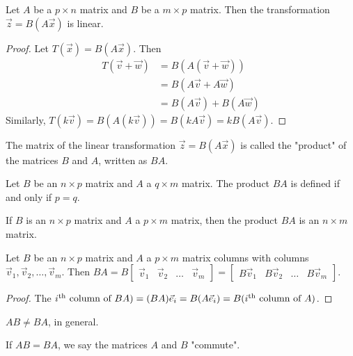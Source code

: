 \documentclass[a4paper,8pt]{article}
\begin{document}
\begin{outline}

    Let \(A\) be a \(p \times n\) matrix and \(B\) be a \(m \times p\) matrix. Then the transformation
    \(\vec{z} = B(A\vec{x})\) is linear.

    \begin{proof}
      Let \(T(\vec{x}) = B(A\vec{x})\). Then
      \begin{align*}
        T(\vec{v}+\vec{w}) &= B(A(\vec{v}+\vec{w}))     \\
                           &= B(A\vec{v}+A\vec{w})      \\
                           &= B(A\vec{v}) + B(A\vec{w})
      \end{align*}
      Similarly, \(T(k\vec{v}) = B(A(k\vec{v})) = B(kA\vec{v}) = kB(A\vec{v})\).
    \end{proof}

    The matrix of the linear transformation \(\vec{z} = B(A\vec{x})\) is called the "product" of the matrices \(B\)
    and \(A\), written as \(BA\).

    Let \(B\) be an \(n \times p\) matrix and \(A\) a \(q \times m\) matrix. The product \(BA\) is defined
    if and only if \(p = q\).

    If \(B\) is an \(n \times p\) matrix and \(A\) a \(p \times m\) matrix, then the product \(BA\) is
    an \(n \times m\) matrix.

    Let \(B\) be an \(n \times p\) matrix and \(A\) a \(p \times m\) matrix columns with columns
    \(\vec{v}_1, \vec{v}_2, \ldots, \vec{v}_m\). Then \(BA = B\begin{bmatrix} \vec{v}_1 & \vec{v}_2 & \ldots
    & \vec{v}_m\end{bmatrix} = \begin{bmatrix} B\vec{v}_1 & B\vec{v}_2 & \ldots & B\vec{v}_m\end{bmatrix}\).

    \begin{proof}
      The \(i\textsuperscript{th} \text{ column of } BA) = (BA)\vec{e}_i = B(A\vec{e}_i) = B(i\textsuperscript{th}
      \text{ column of } A)\).
    \end{proof}

    \(AB \neq BA\), in general.

    If \(AB = BA\), we say the matrices \(A\) and \(B\) "commute".


\end{outline}
\end{document}
